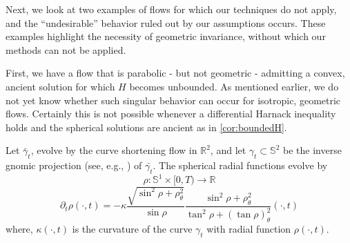 \documentclass{amsart}
\begin{document}
Next, we look at two examples of flows for which our techniques do not apply, and the ``undesirable'' behavior ruled out by our assumptions occurs. These examples highlight the necessity of geometric invariance, without which our methods can not be applied.

First, we have a flow that is parabolic - but not geometric - admitting a convex, ancient solution for which \(H\) becomes unbounded. As mentioned earlier, we do not yet know whether such singular behavior can occur for isotropic, geometric flows. Certainly this is not possible whenever a differential Harnack inequality holds and the spherical solutions are ancient as in \cref{cor:boundedH}.

\begin{example}
Let $\bar{\gamma}_t$, evolve by the curve shortening flow in $\mathbb{R}^2$, and let $\gamma_t \subset \mathbb{S}^2$ be the inverse gnomic projection (see, e.g., \cite{BesauWerner:11/2014}) of \(\bar{\gamma_t}\). The spherical radial functions evolve by
\[\rho:\mathbb{S}^1\times[0,T)\to \mathbb{R}\]
\begin{equation}\label{eq: angenent oval}
\partial_t\rho(\cdot,t)=-\kappa \frac{\sqrt{\sin^2\rho+\rho_{\theta}^2}}{\sin\rho}\frac{\sin^2\rho+\rho_{\theta}^2}{\tan^2\rho+(\tan\rho)_{\theta}^2}(\cdot,t)
\end{equation}
where, $\kappa(\cdot,t)$ is the curvature of the curve $\gamma_t$ with radial function $\rho(\cdot,t).$


\end{example}
\end{document}

